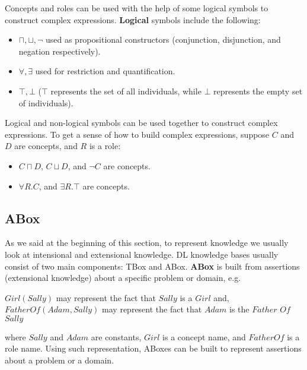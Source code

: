 Concepts and roles can be used with the help of some logical symbols to construct complex expressions. \textbf{Logical} symbols include the following:
\begin{itemize}
\item $\sqcap, \sqcup, \neg$ used as propositional constructors (conjunction, disjunction, and negation respectively).
\item $\forall, \exists$ used for restriction and quantification.
\item $\top, \bot$ ($\top$ represents the set of all individuals, while $\bot$ represents the empty set of individuals). 
\end{itemize}

Logical and non-logical symbols can be used together to construct complex expressions. To get a sense of how to build complex expressions, suppose $C$ and $D$ are concepts, and $R$ is a role:
\begin{itemize}
\item $C \sqcap D$, $C \sqcup D$, and $\neg C$ are concepts.
\item $\forall R.C$, and $\exists R.\top$ are concepts.
\end{itemize}


\subsection{ABox}
As we said at the beginning of this section, to represent knowledge we usually look at intensional and extensional knowledge. DL knowledge bases usually consist of two main components: TBox and ABox. \textbf{ABox} is built from assertions (extensional knowledge) about a specific problem or domain, e.g.
\begin{center}
$Girl(Sally)$ may represent the fact that $Sally$ is a $Girl$ and, \\
$FatherOf(Adam, Sally)$ may represent the fact that $Adam$ is the $Father$ $Of$ $Sally$
\end{center} 
where $Sally$ and $Adam$ are constants, $Girl$ is a concept name, and $FatherOf$ is a role name. Using such representation, ABoxes can be built to represent assertions about a problem or a domain.


